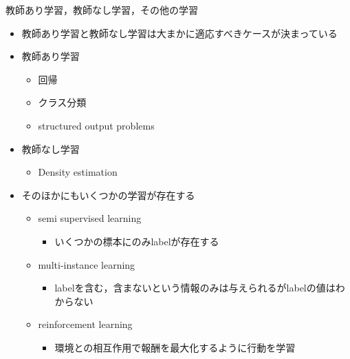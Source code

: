 \documentclass[dvipdfmx, 10pt]{beamer}
\newcommand{\green}[1]{\textcolor{green!40!black}{#1}}
\begin{document}

\begin{frame}{教師あり学習，教師なし学習，その他の学習}
  \begin{itemize}
    \item 教師あり学習と教師なし学習は大まかに適応すべきケースが決まっている
    \item 教師あり学習
    \begin{itemize}
      \item 回帰
      \item クラス分類
      \item structured output problems
    \end{itemize}
    \item 教師なし学習
    \begin{itemize}
      \item Density estimation
    \end{itemize}
    \item そのほかにもいくつかの学習が存在する
    \begin{itemize}
      \item semi supervised learning
      \begin{itemize}
        \item いくつかの標本にのみlabelが存在する
      \end{itemize}
      \item multi-instance learning
      \begin{itemize}
        \item labelを含む，含まないという情報のみは与えられるがlabelの値はわからない
      \end{itemize}
	  \item reinforcement learning
	  \begin{itemize}
        \item 環境との相互作用で報酬を最大化するように行動を学習
      \end{itemize}
    \end{itemize}
  \end{itemize}
\end{frame}

\end{document}
